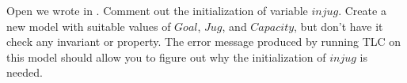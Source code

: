 \documentclass[fleqn,leqno]{article}
\begin{document}
Open  we wrote in
.
Comment out the initialization of variable $injug$.  Create a new model
with suitable values of $Goal$, $Jug$, and $Capacity$, but don't have
it check any invariant or property.  The error message produced by
running TLC on this model should allow you to figure out why the 
initialization of $injug$ is needed.
\end{document}
